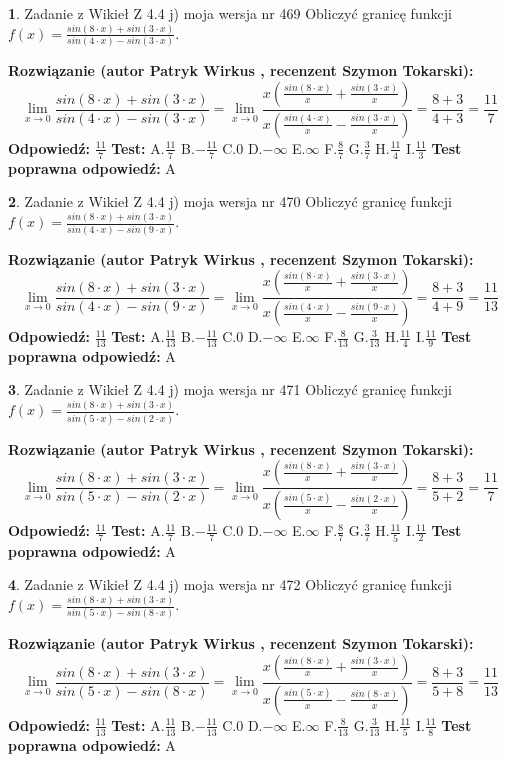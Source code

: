 \documentclass[12pt, a4paper]{article}
\theoremstyle{definition} %
\newtheorem{zad}{}
\newcommand{\zadStart}[1]{\begin{zad}#1\newline}
\newcommand{\zadStop}{\end{zad}}
\newcommand{\rozwStart}[2]{\noindent \textbf{Rozwiązanie (autor #1 , recenzent #2): }\newline}
\newcommand{\rozwStop}{\newline}
\newcommand{\odpStart}{\noindent \textbf{Odpowiedź:}\newline}
\newcommand{\odpStop}{\newline}
\newcommand{\testStart}{\noindent \textbf{Test:}\newline}
\newcommand{\testStop}{\newline}
\newcommand{\kluczStart}{\noindent \textbf{Test poprawna odpowiedź:}\newline}
\newcommand{\kluczStop}{\newline}
\begin{document}
\zadStart{Zadanie z Wikieł Z 4.4 j) moja wersja nr 469}
Obliczyć granicę funkcji $f(x)=\frac{sin(8\cdot x) +sin(3\cdot x)}{sin(4\cdot x) -sin(3\cdot x)}$.
\zadStop
\rozwStart{Patryk Wirkus}{Szymon Tokarski}
$$\lim\limits_{x\to 0}\frac{sin(8\cdot x) +sin(3\cdot x)}{sin(4\cdot x) -sin(3\cdot x)}=\lim\limits_{x\to 0}\frac{x(\frac{sin(8\cdot x)}{x}+\frac{sin(3\cdot x)}{x})}{x(\frac{sin(4\cdot x)}{x}-\frac{sin(3\cdot x)}{x})}=\frac{8+3}{4+3} = \frac{11}{7}$$
\rozwStop
\odpStart
$\frac{11}{7}$
\odpStop
\testStart
A.$\frac{11}{7}$
B.$-\frac{11}{7}$
C.$0$
D.$-\infty$
E.$\infty$
F.$\frac{8}{7}$
G.$\frac{3}{7}$
H.$\frac{11}{4}$
I.$\frac{11}{3}$
\testStop
\kluczStart
A
\kluczStop



\zadStart{Zadanie z Wikieł Z 4.4 j) moja wersja nr 470}
Obliczyć granicę funkcji $f(x)=\frac{sin(8\cdot x) +sin(3\cdot x)}{sin(4\cdot x) -sin(9\cdot x)}$.
\zadStop
\rozwStart{Patryk Wirkus}{Szymon Tokarski}
$$\lim\limits_{x\to 0}\frac{sin(8\cdot x) +sin(3\cdot x)}{sin(4\cdot x) -sin(9\cdot x)}=\lim\limits_{x\to 0}\frac{x(\frac{sin(8\cdot x)}{x}+\frac{sin(3\cdot x)}{x})}{x(\frac{sin(4\cdot x)}{x}-\frac{sin(9\cdot x)}{x})}=\frac{8+3}{4+9} = \frac{11}{13}$$
\rozwStop
\odpStart
$\frac{11}{13}$
\odpStop
\testStart
A.$\frac{11}{13}$
B.$-\frac{11}{13}$
C.$0$
D.$-\infty$
E.$\infty$
F.$\frac{8}{13}$
G.$\frac{3}{13}$
H.$\frac{11}{4}$
I.$\frac{11}{9}$
\testStop
\kluczStart
A
\kluczStop



\zadStart{Zadanie z Wikieł Z 4.4 j) moja wersja nr 471}
Obliczyć granicę funkcji $f(x)=\frac{sin(8\cdot x) +sin(3\cdot x)}{sin(5\cdot x) -sin(2\cdot x)}$.
\zadStop
\rozwStart{Patryk Wirkus}{Szymon Tokarski}
$$\lim\limits_{x\to 0}\frac{sin(8\cdot x) +sin(3\cdot x)}{sin(5\cdot x) -sin(2\cdot x)}=\lim\limits_{x\to 0}\frac{x(\frac{sin(8\cdot x)}{x}+\frac{sin(3\cdot x)}{x})}{x(\frac{sin(5\cdot x)}{x}-\frac{sin(2\cdot x)}{x})}=\frac{8+3}{5+2} = \frac{11}{7}$$
\rozwStop
\odpStart
$\frac{11}{7}$
\odpStop
\testStart
A.$\frac{11}{7}$
B.$-\frac{11}{7}$
C.$0$
D.$-\infty$
E.$\infty$
F.$\frac{8}{7}$
G.$\frac{3}{7}$
H.$\frac{11}{5}$
I.$\frac{11}{2}$
\testStop
\kluczStart
A
\kluczStop



\zadStart{Zadanie z Wikieł Z 4.4 j) moja wersja nr 472}
Obliczyć granicę funkcji $f(x)=\frac{sin(8\cdot x) +sin(3\cdot x)}{sin(5\cdot x) -sin(8\cdot x)}$.
\zadStop
\rozwStart{Patryk Wirkus}{Szymon Tokarski}
$$\lim\limits_{x\to 0}\frac{sin(8\cdot x) +sin(3\cdot x)}{sin(5\cdot x) -sin(8\cdot x)}=\lim\limits_{x\to 0}\frac{x(\frac{sin(8\cdot x)}{x}+\frac{sin(3\cdot x)}{x})}{x(\frac{sin(5\cdot x)}{x}-\frac{sin(8\cdot x)}{x})}=\frac{8+3}{5+8} = \frac{11}{13}$$
\rozwStop
\odpStart
$\frac{11}{13}$
\odpStop
\testStart
A.$\frac{11}{13}$
B.$-\frac{11}{13}$
C.$0$
D.$-\infty$
E.$\infty$
F.$\frac{8}{13}$
G.$\frac{3}{13}$
H.$\frac{11}{5}$
I.$\frac{11}{8}$
\testStop
\kluczStart
A
\kluczStop
\end{document}
